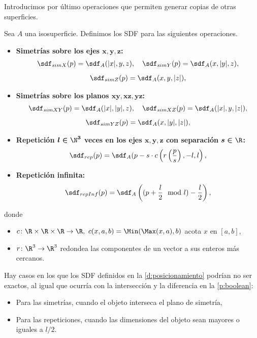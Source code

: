 Introducimos por último operaciones que permiten generar copias de otras superficies.
\begin{definicion}\label{d:posicionamiento}
    Sea $A$ una isosuperficie. Definimos los SDF para las siguientes operaciones.
    \begin{itemize}
        \item \textbf{Simetrías sobre los ejes $\boldsymbol{x,y,z}$:}
        \begin{gather*}
            \sdf_{simX}(p) = \sdf_{A}(\vert x\vert, y, z),\quad \sdf_{simY}(p) = \sdf_{A}(x, \vert y\vert,  z),\\[5pt] \sdf_{simZ}(p) = \sdf_{A}(x,y,\vert z\vert),
        \end{gather*}
        \item \textbf{Simetrías sobre los planos $\boldsymbol{xy,xz,yz}$:}
        \begin{gather*}
            \sdf_{simXY}(p) = \sdf_{A}(\vert x\vert, \vert y\vert, z),\quad \sdf_{simXZ}(p) = \sdf_{A}(\vert x\vert, y,  \vert z\vert),\\[5pt]\sdf_{simYZ}(p) = \sdf_{A}(x,\vert y\vert ,\vert z\vert),
        \end{gather*}
        \item \textbf{Repetición $\boldsymbol{l\in \N^3}$ veces en los ejes $\boldsymbol{x,y,z}$ con separación $\boldsymbol{s\in\R}$:} 
        \begin{equation*}
            \sdf_{rep}(p) = \sdf_{A}(p - s\cdot c\left(r\left(\frac{p}{s}\right), -l, l\right),
        \end{equation*}
        \item \textbf{Repetición infinita:}
        \begin{equation*}
            \sdf_{repInf}(p) = \sdf_{A}\left((p+\frac{l}{2}\mod l )- \frac{l}{2}\right),
        \end{equation*}
    \end{itemize}
    donde
    \begin{itemize}
        \item $c\colon \R\times\R\times\R\to \R,\ c(x,a,b) = \Min(\Max(x, a), b)$ acota $x$ en $[a,b]$,
        \item $r\colon \R^3 \to \R^3$ redondea las componentes de un vector a sus enteros más cercanos.
    \end{itemize}
\end{definicion}

\begin{observacion}
    Hay casos en los que los SDF definidos en la \autoref{d:posicionamiento} podrían no ser exactos, al igual que ocurría con la intersección y la diferencia en la \autoref{p:boolean}:
    \begin{itemize}
        \item Para las simetrías, cuando el objeto interseca el plano de simetría,
        \item Para las repeticiones, cuando las dimensiones del objeto sean mayores o iguales a $l/2$.
    \end{itemize}
\end{observacion}

